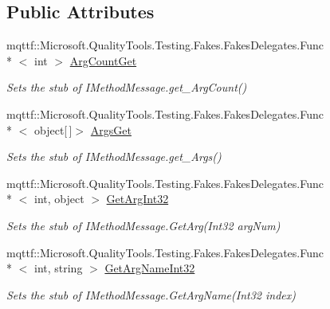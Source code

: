 \subsection*{Public Attributes}
\begin{DoxyCompactItemize}
\item 
mqttf\-::\-Microsoft.\-Quality\-Tools.\-Testing.\-Fakes.\-Fakes\-Delegates.\-Func\\*
$<$ int $>$ \hyperlink{class_system_1_1_runtime_1_1_remoting_1_1_messaging_1_1_fakes_1_1_stub_i_method_call_message_a9035988f14cc273ac96a1b3817e0f1ff}{Arg\-Count\-Get}
\begin{DoxyCompactList}\small\item\em Sets the stub of I\-Method\-Message.\-get\-\_\-\-Arg\-Count()\end{DoxyCompactList}\item 
mqttf\-::\-Microsoft.\-Quality\-Tools.\-Testing.\-Fakes.\-Fakes\-Delegates.\-Func\\*
$<$ object\mbox{[}$\,$\mbox{]}$>$ \hyperlink{class_system_1_1_runtime_1_1_remoting_1_1_messaging_1_1_fakes_1_1_stub_i_method_call_message_a672787e8d5843ca3caee55dea5afe4cd}{Args\-Get}
\begin{DoxyCompactList}\small\item\em Sets the stub of I\-Method\-Message.\-get\-\_\-\-Args()\end{DoxyCompactList}\item 
mqttf\-::\-Microsoft.\-Quality\-Tools.\-Testing.\-Fakes.\-Fakes\-Delegates.\-Func\\*
$<$ int, object $>$ \hyperlink{class_system_1_1_runtime_1_1_remoting_1_1_messaging_1_1_fakes_1_1_stub_i_method_call_message_a6e063a9a7080152b5100c27c2119be6f}{Get\-Arg\-Int32}
\begin{DoxyCompactList}\small\item\em Sets the stub of I\-Method\-Message.\-Get\-Arg(\-Int32 arg\-Num)\end{DoxyCompactList}\item 
mqttf\-::\-Microsoft.\-Quality\-Tools.\-Testing.\-Fakes.\-Fakes\-Delegates.\-Func\\*
$<$ int, string $>$ \hyperlink{class_system_1_1_runtime_1_1_remoting_1_1_messaging_1_1_fakes_1_1_stub_i_method_call_message_af09aae2a88e9d878bb8b8fd530d51e14}{Get\-Arg\-Name\-Int32}
\begin{DoxyCompactList}\small\item\em Sets the stub of I\-Method\-Message.\-Get\-Arg\-Name(\-Int32 index)\end{DoxyCompactList}\item 

\end{DoxyCompactItemize}
